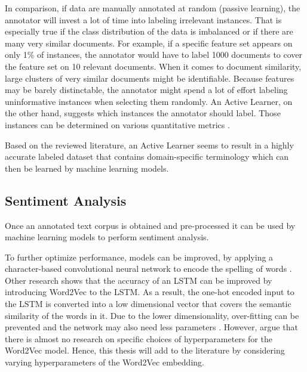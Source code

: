 \documentclass[11pt, a4paper]{article}
\begin{document}
In comparison, if data are manually annotated at random (passive learning), the annotator will invest a lot of time into labeling irrelevant instances. 
That is especially true if the class distribution of the data is imbalanced or if there are many very similar documents. 
For example, if a specific feature set appears on only 1\% of instances, the annotator would have to label 1000 documents to cover 
the feature set on 10 relevant documents. When it comes to document similarity, large clusters of very similar documents might be 
identifiable. Because features may be barely distinctable, the annotator might spend a lot of effort labeling uninformative instances 
when selecting them randomly. An Active Learner, on the other hand, suggests which instances the annotator should label. Those instances can be 
determined on various quantitative metrics \citep{miller2020activelearningapproaches}.

Based on the reviewed literature, an Active Learner seems to result in a highly accurate labeled dataset that contains domain-specific terminology which can then be learned
by machine learning models.

\subsection{Sentiment Analysis}
Once an annotated text corpus is obtained and pre-processed it can be used by machine learning models to perform sentiment analysis.

To further optimize performance, models can be improved, by applying a character-based 
convolutional neural network to encode the spelling of words \citep{pei2019slang}. Other research shows that the accuracy of an
LSTM can be improved by introducing Word2Vec to the LSTM. As a result, the one-hot encoded input to the LSTM is
converted into a low dimensional vector that covers the semantic similarity of the words in it. Due to the lower dimensionality,
over-fitting can be prevented and the network may also need less parameters \citep{xiao2018word2veclstm}. However, \cite{giovanni2021word2vec}
argue that there is almost no research on specific choices of hyperparameters for the Word2Vec model. Hence, this thesis will add to the literature
by considering varying hyperparameters of the Word2Vec embedding.
\end{document}
